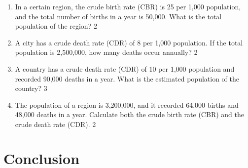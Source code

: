 \documentclass[a4paper,oneside, margin=1.4in]{book}
\begin{document}
\begin{enumerate}
\item In a certain region, the crude birth rate (CBR) is 25 per 1,000 population, and the total number of births in a year is 50,000. What is the total population of the region? \hfill 2

\item A city has a crude death rate (CDR) of 8 per 1,000 population. If the total population is 2,500,000, how many deaths occur annually? \hfill 2  

\item A country has a crude death rate (CDR) of 10 per 1,000 population and recorded 90,000 deaths in a year. What is the estimated population of the country? \hfill 3  

\item The population of a region is 3,200,000, and it recorded 64,000 births and 48,000 deaths in a year. Calculate both the crude birth rate (CBR) and the crude death rate (CDR). \hfill 2


  
    \end{enumerate}

\backmatter
\chapter{Conclusion}
\lipsum[8]

\tableofcontents
\end{document}
